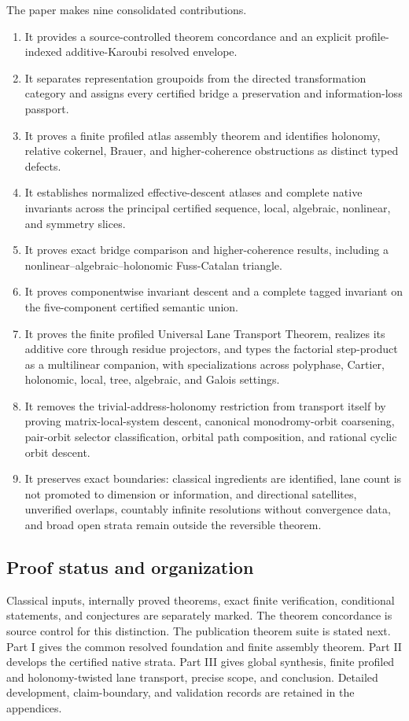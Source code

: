 \documentclass[11pt]{article}
\theoremstyle{definition}
\theoremstyle{remark}
\begin{document}
The paper makes nine consolidated contributions.
\begin{enumerate}
\item It provides a source-controlled theorem concordance and an explicit profile-indexed additive-Karoubi resolved envelope.
\item It separates representation groupoids from the directed transformation category and assigns every certified bridge a preservation and information-loss passport.
\item It proves a finite profiled atlas assembly theorem and identifies holonomy, relative cokernel, Brauer, and higher-coherence obstructions as distinct typed defects.
\item It establishes normalized effective-descent atlases and complete native invariants across the principal certified sequence, local, algebraic, nonlinear, and symmetry slices.
\item It proves exact bridge comparison and higher-coherence results, including a nonlinear--algebraic--holonomic Fuss-Catalan triangle.
\item It proves componentwise invariant descent and a complete tagged invariant on the five-component certified semantic union.
\item It proves the finite profiled Universal Lane Transport Theorem, realizes its additive core through residue projectors, and types the factorial step-product as a multilinear companion, with specializations across polyphase, Cartier, holonomic, local, tree, algebraic, and Galois settings.
\item It removes the trivial-address-holonomy restriction from transport itself by proving matrix-local-system descent, canonical monodromy-orbit coarsening, pair-orbit selector classification, orbital path composition, and rational cyclic orbit descent.
\item It preserves exact boundaries: classical ingredients are identified, lane count is not promoted to dimension or information, and directional satellites, unverified overlaps, countably infinite resolutions without convergence data, and broad open strata remain outside the reversible theorem.
\end{enumerate}

\subsection{Proof status and organization}

Classical inputs, internally proved theorems, exact finite verification, conditional statements, and conjectures are separately marked. The theorem concordance is source control for this distinction. The publication theorem suite is stated next. Part I gives the common resolved foundation and finite assembly theorem. Part II develops the certified native strata. Part III gives global synthesis, finite profiled and holonomy-twisted lane transport, precise scope, and conclusion. Detailed development, claim-boundary, and validation records are retained in the appendices.
\end{document}

